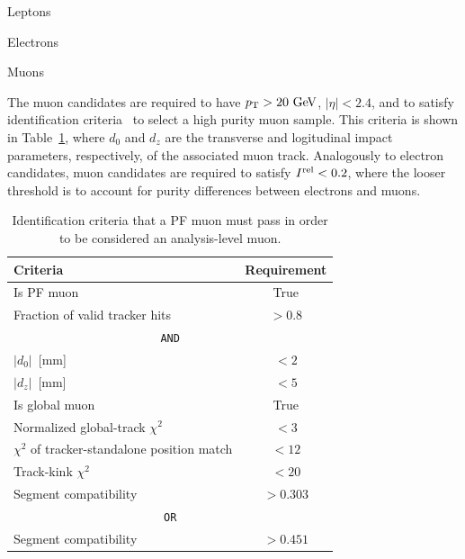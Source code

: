 \begin{section}{Leptons}
\begin{subsection}{Electrons}
\end{subsection}

\begin{subsection}{Muons}

The muon candidates are required to have $p_{\mathrm{T}} > 20~\mathrm{Ge\kern -0.1em V}$, $|\eta| < 2.4$, and to satisfy identification criteria~\cite{muon_id} to select a high purity muon sample.
This criteria is shown in Table~\ref{tab:muon_id}, where $d_0$ and $d_z$ are the transverse and logitudinal impact parameters, respectively, of the associated muon track.
Analogously to electron candidates, muon candidates are required to satisfy $I^{\mathrm{rel}} < 0.2$, where the looser threshold is to account for purity differences between electrons and muons.

\begin{table}[tb!]
\centering
\begin{tabular}{l|c}
\hline \hline
Criteria                                       &  Requirement \\
\hline
Is PF muon                                     &  True        \\
Fraction of valid tracker hits                 &  $> 0.8$     \\
\hline
\multicolumn{2}{c}{\texttt{AND}}                                       \\      
$|d_0|$~[mm]                                   &  $< 2$       \\
$|d_z|$~[mm]                                   &  $< 5$       \\
Is global muon                                 &  True        \\
Normalized global-track $\chi^2$               &  $< 3$       \\
$\chi^2$ of tracker-standalone position match  &  $< 12$      \\
Track-kink $\chi^2$                            &  $< 20$      \\
Segment compatibility                          &  $> 0.303$   \\
\multicolumn{2}{c}{\texttt{OR}}                                        \\
Segment compatibility                          &  $> 0.451$   \\
\hline\hline
\end{tabular}
\caption{Identification criteria that a PF muon must pass in order to be considered an analysis-level muon.}
\label{tab:muon_id}
\end{table}


\end{subsection}
\end{section}
